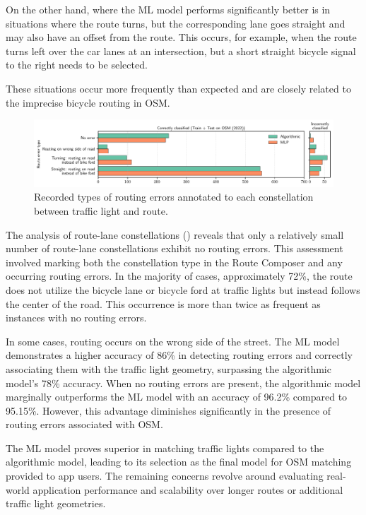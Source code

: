 On the other hand, where the ML model performs significantly better is in situations where the route turns, but the corresponding lane goes straight and may also have an offset from the route. This occurs, for example, when the route turns left over the car lanes at an intersection, but a short straight bicycle signal to the right needs to be selected.

These situations occur more frequently than expected and are closely related to the imprecise bicycle routing in OSM.

\begin{figure}[t]
\centering 
\includegraphics[width=\linewidth]{images/matching-route-errors-osm-old.pdf}
\caption{Recorded types of routing errors annotated to each constellation between traffic light and route.}
\label{fig:matching-routing-errors-osm}
\end{figure}

The analysis of route-lane constellations () reveals that only a relatively small number of route-lane constellations exhibit no routing errors. This assessment involved marking both the constellation type in the Route Composer and any occurring routing errors. In the majority of cases, approximately 72\%, the route does not utilize the bicycle lane or bicycle ford at traffic lights but instead follows the center of the road. This occurrence is more than twice as frequent as instances with no routing errors.

In some cases, routing occurs on the wrong side of the street. The ML model demonstrates a higher accuracy of 86\% in detecting routing errors and correctly associating them with the traffic light geometry, surpassing the algorithmic model's 78\% accuracy. When no routing errors are present, the algorithmic model marginally outperforms the ML model with an accuracy of 96.2\% compared to 95.15\%. However, this advantage diminishes significantly in the presence of routing errors associated with OSM.

The ML model proves superior in matching traffic lights compared to the algorithmic model, leading to its selection as the final model for OSM matching provided to app users. The remaining concerns revolve around evaluating real-world application performance and scalability over longer routes or additional traffic light geometries.

